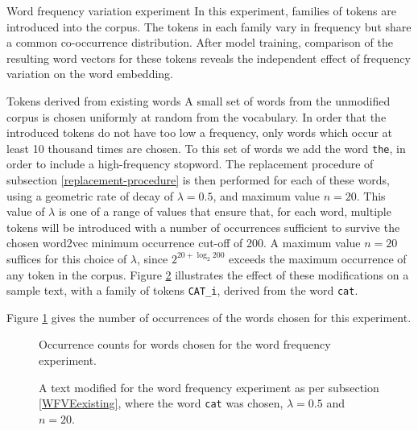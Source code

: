 \documentclass{article} %
\newcommand{\word}[1]{\texttt{#1}}
\begin{document}
\begin{section}{Word frequency variation experiment}\label{WFVE}
In this experiment, families of tokens are introduced into the corpus.
The tokens in each family vary in frequency but share a common co-occurrence distribution.
After model training, comparison of the resulting word vectors for these tokens reveals the independent effect of frequency variation on the word embedding.

\begin{subsection}{Tokens derived from existing words}\label{WFVEexisting}
A small set of words from the unmodified corpus is chosen uniformly at random from the vocabulary.
In order that the introduced tokens do not have too low a frequency, only words which occur at least 10 thousand times are chosen.
To this set of words we add the word \word{the}, in order to include a high-frequency stopword.
The replacement procedure of subsection \ref{replacement-procedure} is then performed for each of these words, using a geometric rate of decay of $\lambda = 0.5$, and maximum value $n=20$.
This value of $\lambda$ is one of a range of values that ensure that, for each word, multiple tokens will be introduced with a number of occurrences sufficient to survive the chosen word2vec minimum occurrence cut-off of 200.  
A maximum value $n=20$ suffices for this choice of $\lambda$, since $2^{20 + \log_2{200}}$ exceeds the maximum occurrence of any token in the corpus. 
Figure \ref{fig:word-frequency-experiment-text-cat} illustrates the effect of these modifications on a sample text, with a family of tokens \word{CAT\_i}, derived from the word \word{cat}.

Figure \ref{fig:word-frequency-counts} gives the number of occurrences of the words chosen for this experiment.

\begin{figure}\label{fig:word-frequency-counts}
	
	\caption{Occurrence counts for words chosen for the word frequency experiment. }
\end{figure}

\begin{figure}
	
	\caption{A text modified for the word frequency experiment as per subsection \ref{WFVEexisting}, where the
	word \word{cat} was chosen, $\lambda=0.5$ and $n=20$.}
	\label{fig:word-frequency-experiment-text-cat}
\end{figure}

\end{subsection}


\end{section}
\end{document}

